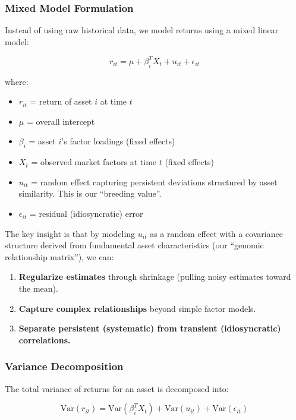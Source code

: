 \documentclass[
]{article}
\providecommand{\tightlist}{%
  \setlength{\itemsep}{0pt}\setlength{\parskip}{0pt}}
\begin{document}
\subsubsection{Mixed Model Formulation}\label{mixed-model-formulation}

Instead of using raw historical data, we model returns using a mixed
linear model:

\[r_{it} = \mu + \beta_i^T X_t + u_{it} + \epsilon_{it}\]

where:

\begin{itemize}
\tightlist
\item
  \(r_{it}\) = return of asset \(i\) at time \(t\)
\item
  \(\mu\) = overall intercept
\item
  \(\beta_i\) = asset \(i\)'s factor loadings (fixed effects)
\item
  \(X_t\) = observed market factors at time \(t\) (fixed effects)
\item
  \(u_{it}\) = random effect capturing persistent deviations structured
  by asset similarity. This is our ``breeding value''.
\item
  \(\epsilon_{it}\) = residual (idiosyncratic) error
\end{itemize}

The key insight is that by modeling \(u_{it}\) as a random effect with a
covariance structure derived from fundamental asset characteristics (our
``genomic relationship matrix''), we can:

\begin{enumerate}
\def\labelenumi{\arabic{enumi}.}
\tightlist
\item
  \textbf{Regularize estimates} through shrinkage (pulling noisy
  estimates toward the mean).
\item
  \textbf{Capture complex relationships} beyond simple factor models.
\item
  \textbf{Separate persistent (systematic) from transient
  (idiosyncratic) correlations.}
\end{enumerate}

\subsubsection{Variance Decomposition}\label{variance-decomposition}

The total variance of returns for an asset is decomposed into:

\[\text{Var}(r_{it}) = \text{Var}(\beta_i^T X_t) + \text{Var}(u_{it}) + \text{Var}(\epsilon_{it})\]
\end{document}
